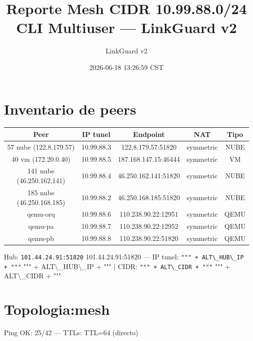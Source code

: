 \documentclass[11pt,a4paper]{article}
\title{Reporte Mesh CIDR 10.99.88.0/24 CLI Multiuser — LinkGuard v2}
\author{LinkGuard v2}
\date{2026-06-18 13:26:59 CST}
\begin{document}
\maketitle

\section{Inventario de peers}
\begin{longtable}{|c|c|c|c|c|}
\hline
Peer & IP tunel & Endpoint & NAT & Tipo \\ \hline
57 nube (122.8.179.57) & 10.99.88.3 & 122.8.179.57:51820 & symmetric & NUBE \\ \hline
40 vm (172.20.0.40) & 10.99.88.5 & 187.168.147.15:46444 & symmetric & VM \\ \hline
141 nube (46.250.162.141) & 10.99.88.4 & 46.250.162.141:51820 & symmetric & NUBE \\ \hline
185 nube (46.250.168.185) & 10.99.88.2 & 46.250.168.185:51820 & symmetric & NUBE \\ \hline
qemu-orq & 10.99.88.6 & 110.238.90.22:12951 & symmetric & QEMU \\ \hline
qemu-pa & 10.99.88.7 & 110.238.90.22:12952 & symmetric & QEMU \\ \hline
qemu-pb & 10.99.88.8 & 110.238.90.22:51820 & symmetric & QEMU \\ \hline
\end{longtable}

Hub:  \texttt{101.44.24.91:51820} 101.44.24.91:51820  — IP tunel:  \texttt{""" + ALT\textbackslash{}_HUB\textbackslash{}_IP + """} """ + ALT\textbackslash{}_HUB\textbackslash{}_IP + """  | CIDR:  \texttt{""" + ALT\textbackslash{}_CIDR + """} """ + ALT\textbackslash{}_CIDR + """\\

\section{Topologia:mesh}
Ping OK: 25/42 — TTLs: TTL=64 (directo)\\
\end{document}
